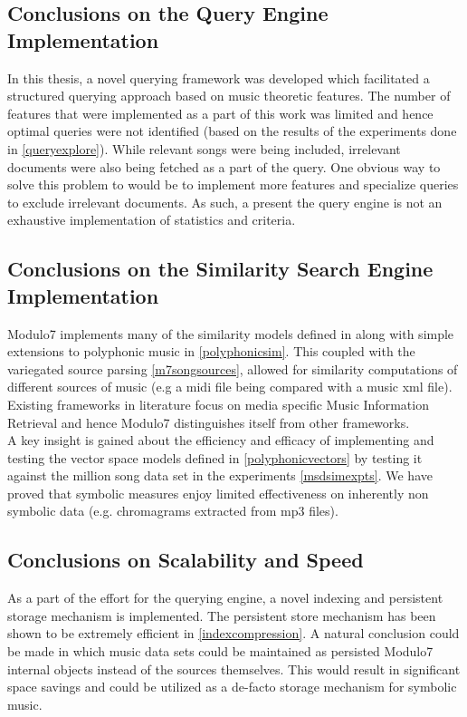 \subsection{Conclusions on the Query Engine Implementation}

\noindent In this thesis, a novel querying framework was developed which facilitated a structured querying approach based on music theoretic features. The number of features that were implemented as a part of this work was limited and hence optimal queries were not identified (based on the results of the experiments done in \ref{queryexplore}). While relevant songs were being included, irrelevant documents were also being fetched as a part of the query. One obvious way to solve this problem to would be to implement more features and specialize queries to exclude irrelevant documents. As such, a present the query engine is not an exhaustive implementation of statistics and criteria.  

\subsection{Conclusions on the Similarity Search Engine Implementation}

\noindent Modulo7 implements many of the similarity models defined in \cite{similietechnicalmanual} along with simple extensions to polyphonic music in \ref{polyphonicsim}. This coupled with the variegated source parsing \ref{m7songsources}, allowed for similarity computations of different sources of music (e.g a midi file being compared with a music xml file). Existing frameworks in literature \cite{jMIR, marsyas, similie, humdrum}  focus on media specific Music Information Retrieval and hence Modulo7 distinguishes itself from other frameworks. \\

\noindent A key insight is gained about the efficiency and efficacy of  implementing and testing the vector space models defined in  \ref{polyphonicvectors} by testing it against the million song data set\cite{msd} in the experiments \ref{msdsimexpts}. We have proved that symbolic measures enjoy limited effectiveness on inherently non symbolic data (e.g. chromagrams extracted from mp3 files). 

\subsection{Conclusions on Scalability and Speed}

\noindent As a part of the effort for the querying engine, a novel indexing and persistent storage mechanism is implemented. The persistent store mechanism has been shown to be extremely efficient in \ref{indexcompression}. A natural conclusion could be made in which music data sets could be maintained as persisted Modulo7 internal objects instead of the sources themselves. This would result in significant space savings and could be utilized as a de-facto storage mechanism for symbolic music. \\

